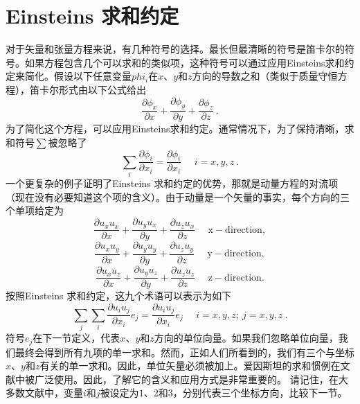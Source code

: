 \documentclass[LBMDerivation.tex]{subfiles}
\begin{document}
\section{Einsteins 求和约定}
%
%
	对于矢量和张量方程来说，有几种符号的选择。最长但最清晰的符号是笛卡尔的符号。如果方程包含几个可以求和的类似项，这种符号可以通过应用Einsteins求和约定来简化。假设以下任意变量$phi_i$在$x$、$y$和$z$方向的导数之和（类似于质量守恒方程），笛卡尔形式由以下公式给出
%
%
\begin{equation*}
 \frac{\partial \phi_x}{\partial x}
+\frac{\partial \phi_y}{\partial y}
+\frac{\partial \phi_z}{\partial z} ~.
\end{equation*}
%
%
	为了简化这个方程，可以应用Einsteins求和约定。通常情况下，为了保持清晰，求和符号$\sum$被忽略了
%
%
\begin{equation}
  \sum_{i} \frac{\partial \phi_i}{\partial x_i}
=
  \frac{\partial \phi_i}{\partial x_i} ~~~~~~ i=x,y,z ~.
\end{equation}
%
%
    一个更复杂的例子证明了Einsteins 求和约定的优势，那就是动量方程的对流项（现在没有必要知道这个项的含义）。由于动量是一个矢量的事实，每个方向的三个单项给定为
%
%
\begin{equation*}
 \frac{\partial u_x u_x}{\partial x}
 +
 \frac{\partial u_y u_x}{\partial y}
 +
    \frac{\partial u_z u_x}{\partial z}~~~~~~ \mathrm{x-direction},
\end{equation*}
%
%
\begin{equation*}
 \frac{\partial u_x u_y}{\partial x}
 +
 \frac{\partial u_y u_y}{\partial y}
 +
    \frac{\partial u_z u_y}{\partial z}~~~~~~ \mathrm{y-direction},
\end{equation*}
%
%
\begin{equation*}
 \frac{\partial u_x u_z}{\partial x}
 +
 \frac{\partial u_y u_z}{\partial y}
 +
    \frac{\partial u_z u_z}{\partial z}~~~~~~ \mathrm{z-direction}.
\end{equation*}
%
%
按照Einsteins 求和约定，这九个术语可以表示为如下
%
%
\begin{equation}
 \sum_j \sum_i \frac{\partial u_i u_j}{\partial x_i} e_j =  \frac{\partial u_i u_j}{\partial x_i} e_j ~~~~~~i=x,y,z; ~j=x,y,z~.
\end{equation}
%
%
    符号$e_j$在下一节定义，代表$x$、$y$和$z$方向的单位向量。如果我们忽略单位向量，我们最终会得到所有九项的单一求和。然而，正如人们所看到的，我们有三个与坐标$x$、$y$和$z$有关的单一求和。因此，单位矢量必须被加上。爱因斯坦的求和惯例在文献中被广泛使用。因此，了解它的含义和应用方式是非常重要的。
%
%
    请记住，在大多数文献中，变量$i$和$j$被设定为$1$、$2$和$3$，分别代表三个坐标方向，比较下一节。
%
%
\end{document}
